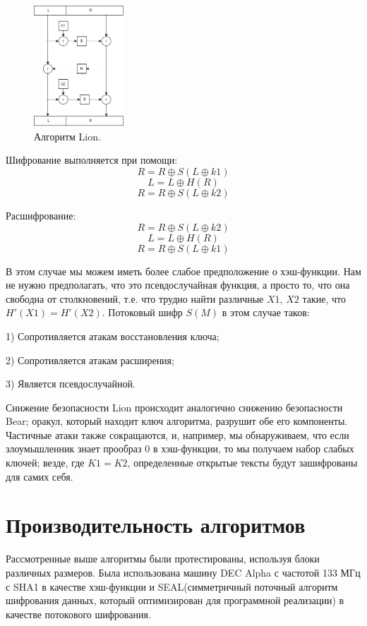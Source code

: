 \documentclass[12pt]{article}
\begin{document}
\begin{figure}
\centering
\includegraphics[width=0.3\textwidth]{Lion.png}
\caption{\label{fig:Lion}Алгоритм Lion.}
\end{figure}
\vspace{5mm}

\vspace{5mm}
Шифрование выполняется при помощи:
\[R = R\oplus S(L\oplus k1)\]
\[L = L\oplus H(R)\]
\[R = R\oplus S(L\oplus k2)\]

Расшифрование:
\[R = R\oplus S(L\oplus k2)\]
\[L = L\oplus H(R)\]
\[R = R\oplus S(L\oplus k1)\]

\vspace{5mm}
В этом случае мы можем иметь более слабое предположение о хэш-функции. Нам не
нужно предполагать, что это псевдослучайная функция, а просто то, что она
свободна от столкновений, т.е. что трудно найти различные $X1$, $X2$ такие, что $H'(X1) = H'(X2)$. Потоковый шифр $S(M)$ в этом случае таков: 

 1) Сопротивляется атакам восстановления ключа;
    
 2) Сопротивляется атакам расширения;

 3) Является псевдослучайной.

\vspace{5mm}
Снижение безопасности Lion происходит аналогично снижению безопасности Bear; оракул, который находит ключ алгоритма, разрушит обе его компоненты. Частичные атаки также сокращаются, и, например, мы обнаруживаем, что если злоумышленник знает прообраз 0 в хэш-функции, то мы получаем набор слабых ключей; везде, где $K1 = K2$, определенные открытые тексты будут зашифрованы для самих себя. 


\section{Производительность алгоритмов}
Рассмотренные выше алгоритмы были протестированы, используя блоки различных размеров. Была использована машину DEC Alpha с частотой 133 МГц с SHA1 в качестве хэш-функции и SEAL(симметричный поточный алгоритм шифрования данных, который оптимизирован для программной реализации) в качестве потокового шифрования.
\end{document}

